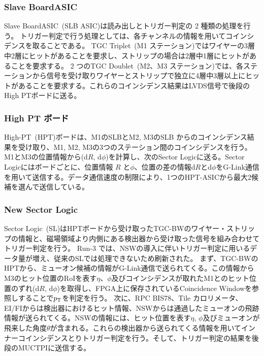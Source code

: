 \subsubsection{Slave BoardASIC}
Slave BoardASIC~(SLB ASIC)は読み出しとトリガー判定の 2 種類の処理を行う。
トリガー判定で行う処理としては、各チャンネルの情報を用いてコインシデンスを取ることである。
TGC Triplet~(M1 ステーション)ではワイヤーの3層中2層にヒットがあることを要求し、ストリップの場合は2層中1層にヒットがあることを要求する。
2 つのTGC Doublet~(M2、M3 ステーション)では、各ステーションから信号を受け取りワイヤーとストリップで独立に4層中3層以上にヒットがあることを要求する。これらのコインシデンス結果はLVDS信号で後段のHigh PTボードに送る。

\subsubsection{High PT ボード}
High-PT~(HPT)ボードは、M1のSLBとM2, M3のSLB からのコインシデンス結果を受け取り、M1, M2, M3の3つのステーション間のコインシデンスを行う。M1とM3の位置情報から(d$R$, d$\phi$)を計算し、次のSector Logicに送る。Sector Logicにはボードごとに、位置情報 $R$ と$\phi$、位置の差の情報d$R$とd$\phi$をG-Link通信を用いて送信する。データ通信速度の制限により、1つのHPT-ASICから最大2候補を選んで送信している。

\subsubsection{New Sector Logic}
Sector Logic~(SL)はHPTボードから受け取ったTGC-BWのワイヤー・ストリップの情報と、磁場領域より内側にある検出器から受け取った信号を組み合わせてトリガー判定を行う。
Run-3 では、NSWの導入に伴いトリガー判定に用いるデータ量が増え、従来のSLでは処理できないため刷新された。
まず、TGC-BWのHPTから、ミューオン候補の情報がG-Link通信で送られてくる。この情報からM3のヒット位置のRoIを表す$\eta$、$\phi$及びコインシデンスが取れたM1とのヒット位置のずれ(d$R$, d$\phi$)を取得し、FPGA上に保存されているCoincidence Windowを参照しすることで$p_{\rm{T}}$を判定を行う。
次に、RPC BIS78、Tile カロリメータ、EI/FIからは検出器におけるヒット情報、NSWからは通過したミューオンの飛跡情報が送られてくる。NSWの情報には、ヒット位置を表す$\eta$, $\phi$及びミューオンが飛来した角度$\theta$が含まれる。これらの検出器から送られてくる情報を用いてインナーコインシデンスとりトリガー判定を行う。そして、トリガー判定の結果を後段のMUCTPIに送信する。

